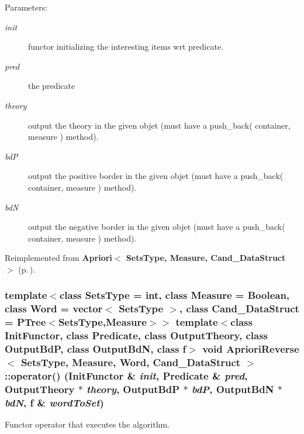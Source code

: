 \begin{Desc}
\item[Parameters:]
\begin{description}
\item[{\em init}]functor initializing the interesting items wrt predicate. \item[{\em pred}]the predicate \item[{\em theory}]output the theory in the given objet (must have a push\_\-back( container, measure ) method). \item[{\em bd\-P}]output the positive border in the given objet (must have a push\_\-back( container, measure ) method). \item[{\em bd\-N}]output the negative border in the given objet (must have a push\_\-back( container, measure ) method). \end{description}
\end{Desc}


Reimplemented from {\bf Apriori$<$ Sets\-Type, Measure, Cand\_\-Data\-Struct $>$} {\rm (p.\,\pageref{class_apriori_f0a2087314d1753cc3dd397c4a3f3dda})}.
\subsubsection{\setlength{\rightskip}{0pt plus 5cm}template$<$class Sets\-Type = int, class Measure = Boolean, class Word = vector$<$ Sets\-Type $>$, class Cand\_\-Data\-Struct = PTree$<$Sets\-Type,Measure$>$$>$ template$<$class Init\-Functor, class Predicate, class Output\-Theory, class Output\-Bd\-P, class Output\-Bd\-N, class f$>$ void {\bf Apriori\-Reverse}$<$ Sets\-Type, Measure, Word, Cand\_\-Data\-Struct $>$::operator() (Init\-Functor \& {\em init}, {\bf Predicate} \& {\em pred}, Output\-Theory $\ast$ {\em theory}, Output\-Bd\-P $\ast$ {\em bd\-P}, Output\-Bd\-N $\ast$ {\em bd\-N}, f \& {\em word\-To\-Set})\hspace{0.3cm}{\tt  [inline]}}\label{class_apriori_reverse_f82618122967f0c6da9c4de5ea60a367}


Functor operator that executes the algorithm. 

